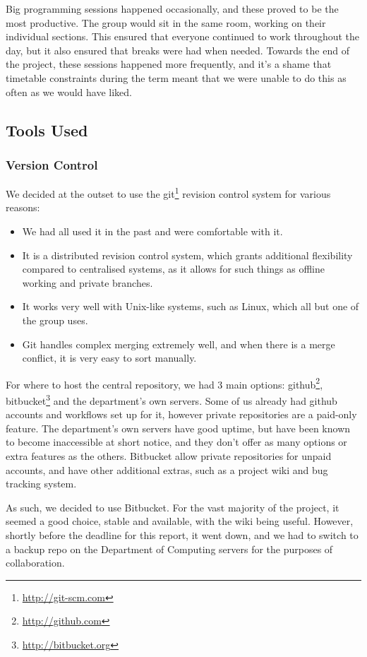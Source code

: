   Big programming sessions happened occasionally, and these proved to be the most productive. The group would sit in the same room, working on their individual sections. This ensured that everyone continued to work throughout the day, but it also ensured that breaks were had when needed. Towards the end of the project, these sessions happened more frequently, and it's a shame that timetable constraints during the term meant that we were unable to do this as often as we would have liked.

  \subsection{Tools Used}
    \subsubsection{Version Control}
      We decided at the outset to use the git\footnote{\url{http://git-scm.com}} revision control system for various reasons:
      \begin{itemize}
      \item We had all used it in the past and were comfortable with it.
      \item It is a distributed revision control system, which grants additional flexibility compared to centralised systems, as it allows for such things as offline working and private branches.
      \item It works very well with Unix-like systems, such as Linux, which all but one of the group uses.
      \item Git handles complex merging extremely well, and when there is a merge conflict, it is very easy to sort manually.
      \end{itemize}

      For where to host the central repository, we had 3 main options: github\footnote{\url{http://github.com}}, bitbucket\footnote{\url{http://bitbucket.org}} and the department's own servers.
      Some of us already had github accounts and workflows set up for it, however private repositories are a paid-only feature.
      The department's own servers have good uptime, but have been known to become inaccessible at short notice, and they don't offer as many options or extra features as the others.
      Bitbucket allow private repositories for unpaid accounts, and have other additional extras, such as a project wiki and bug tracking system.

      As such, we decided to use Bitbucket.
      For the vast majority of the project, it seemed a good choice, stable and available, with the wiki being useful.
      However, shortly before the deadline for this report, it went down, and we had to switch to a backup repo on the Department of Computing servers for the purposes of collaboration.  
